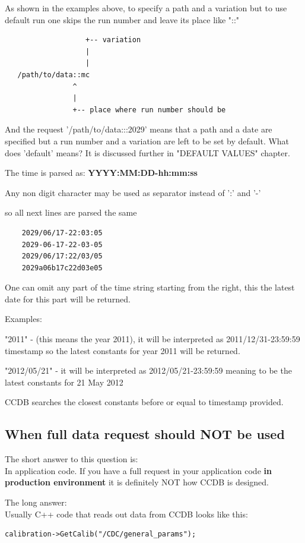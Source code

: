 \documentclass{article}
\begin{document}
As shown in the examples above, to specify a path and a variation but
to use default run one skips the run number and leave its place like "::"
\begin{verbatim}
                   +-- variation
                   |
                   |
   /path/to/data::mc
                ^
                |
                +-- place where run number should be
\end{verbatim}


And the request '/path/to/data:::2029' means that a path and a date are specified
but a run number and a variation are left to be set by default.
What does 'default' means? It is discussed further in "DEFAULT VALUES" chapter.

The time is parsed as:
    \textbf{YYYY:MM:DD-hh:mm:ss}

Any non digit character may be used as separator instead of ':' and '-'

so all next lines are parsed the same
\begin{verbatim}
    2029/06/17-22:03:05
    2029-06-17-22-03-05
    2029/06/17:22/03/05
    2029a06b17c22d03e05
\end{verbatim}

One can omit any part of the time string starting from the right, this the 
latest date for this part will be returned.

Examples:

"2011" - (this means the year 2011), it will be interpreted as
2011/12/31-23:59:59 timestamp so the latest constants for year
2011 will be returned.


"2012/05/21" - it will be interpreted as 2012/05/21-23:59:59 meaning to be the
latest constants for 21 May 2012

CCDB searches the closest constants before or equal to timestamp provided.

%
\subsection{When full data request should NOT be used}

The short answer to this question is: \\
In application code. If you have a full request in your application code \textbf{in production environment} it is definitely NOT how CCDB is designed. 

The long answer:\\
Usually C++ code that reads out data from CCDB looks like this:
\begin{verbatim}
calibration->GetCalib("/CDC/general_params");
\end{verbatim}
\end{document}
